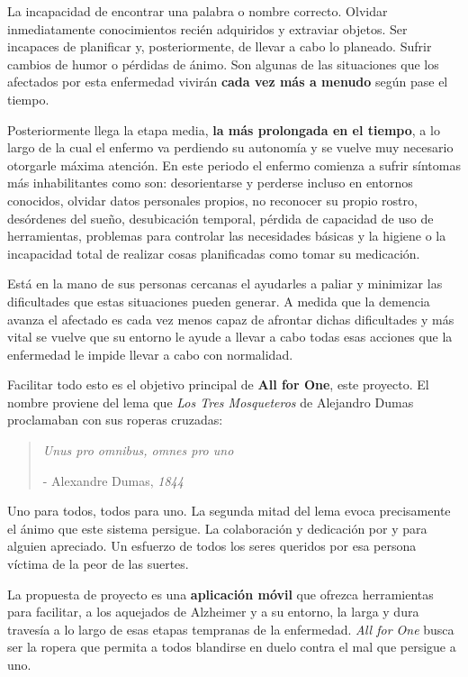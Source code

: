 \newpage

La incapacidad de encontrar una palabra o nombre correcto. Olvidar inmediatamente conocimientos recién adquiridos y extraviar objetos. Ser incapaces de planificar y, posteriormente, de llevar a cabo lo planeado. Sufrir cambios de humor o pérdidas de ánimo. Son algunas de las situaciones que los afectados por esta enfermedad vivirán \textbf{cada vez más a menudo} según pase el tiempo.

Posteriormente llega la etapa media, \textbf{la más prolongada en el tiempo}, a lo largo de la cual el enfermo va perdiendo su autonomía y se vuelve muy necesario otorgarle máxima atención. En este periodo el enfermo comienza a sufrir síntomas más inhabilitantes como son: desorientarse y perderse incluso en entornos conocidos, olvidar datos personales propios, no reconocer su propio rostro, desórdenes del sueño, desubicación temporal, pérdida de capacidad de uso de herramientas, problemas para controlar las necesidades básicas y la higiene o la incapacidad total de realizar cosas planificadas como tomar su medicación.

Está en la mano de sus personas cercanas el ayudarles a paliar y minimizar las dificultades que estas situaciones pueden generar. A medida que la demencia avanza el afectado es cada vez menos capaz de afrontar dichas dificultades y más vital se vuelve que su entorno le ayude a llevar a cabo todas esas acciones que la enfermedad le impide llevar a cabo con normalidad.

Facilitar todo esto es el objetivo principal de \textbf{All for One}, este proyecto. El nombre proviene del lema que \emph{Los Tres Mosqueteros} de Alejandro Dumas proclamaban con sus roperas cruzadas: 

\begin{quotation} 
    \centering
    \emph{Unus pro omnibus, omnes pro uno}
    \vspace{-20pt}
    \begin{flushright}
        - Alexandre Dumas, \textit{1844}
    \end{flushright} 
\end{quotation} 

Uno para todos, todos para uno. La segunda mitad del lema evoca precisamente el ánimo que este sistema persigue. La colaboración y dedicación por y para alguien apreciado. Un esfuerzo de todos los seres queridos por esa persona víctima de la peor de las suertes.

La propuesta de proyecto es una \textbf{aplicación móvil} que ofrezca herramientas para facilitar, a los aquejados de Alzheimer y a su entorno, la larga y dura travesía a lo largo de esas etapas tempranas de la enfermedad. \emph{All for One} busca ser la ropera que permita a todos blandirse en duelo contra el mal que persigue a uno.